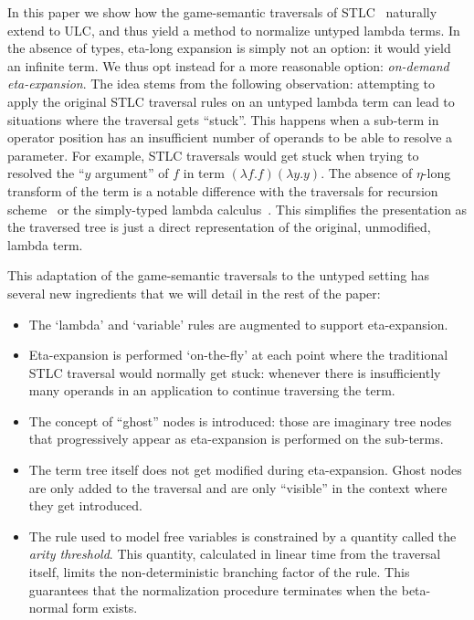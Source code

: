 \documentclass{article}
\theoremstyle{plain}
\theoremstyle{definition}
\theoremstyle{remark}
\begin{document}
In this paper we show how the game-semantic traversals of STLC~\cite{BlumPhd} naturally extend to ULC, and thus yield a method to normalize untyped lambda terms. In the absence of types, eta-long expansion is simply not an option: it would yield an infinite term. We thus opt instead for a more reasonable option: \emph{on-demand eta-expansion}. The idea stems from the following observation: attempting to apply the original STLC traversal rules on an untyped lambda term can lead to situations where the traversal gets ``stuck''. This happens when a sub-term in operator position has an insufficient number of operands to be able to resolve a parameter. For example, STLC traversals would get stuck when trying to resolved the ``$y$ argument'' of $f$ in term $(\lambda f.f)(\lambda y.y)$. The absence of $\eta$-long transform of the term is a notable difference with the traversals for recursion scheme~\cite{Ong2006} or the simply-typed lambda calculus~\cite{BlumPhd}. This simplifies the presentation as the traversed tree is just a direct representation of the original, unmodified, lambda term.

This adaptation of the game-semantic traversals to the untyped setting has several new ingredients that we will detail in the rest of the paper:
\begin{itemize}
\item  The `lambda' and `variable' rules are augmented to support eta-expansion.
 \item Eta-expansion is performed `on-the-fly' at each point where the traditional STLC traversal would normally get stuck: whenever there is insufficiently many operands in an application to continue traversing the term.
\item The concept of ``ghost'' nodes is introduced: those are imaginary tree nodes that progressively appear as eta-expansion is performed on the sub-terms.
\item The term tree itself does not get modified during eta-expansion. Ghost nodes are only added to the traversal and are only ``visible'' in the context where they get introduced.
\item The rule used to model free variables is constrained by a quantity called the \emph{arity threshold}. This quantity, calculated in linear time from the traversal itself, limits the non-deterministic branching factor of the rule. This guarantees that the normalization procedure terminates when the beta-normal form exists.
\end{itemize}
\end{document}
